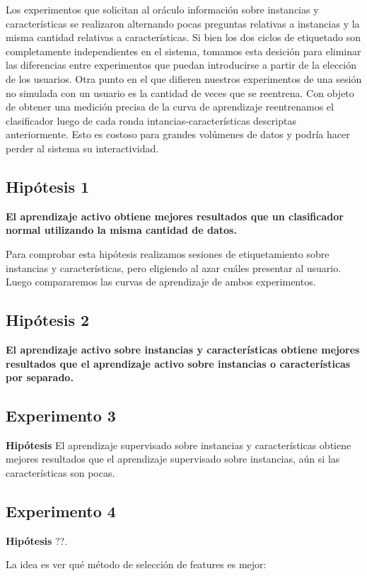 Los experimentos que solicitan al oráculo información sobre instancias y características se realizaron alternando pocas preguntas relativas a instancias y la misma cantidad relativas a características. Si bien los dos ciclos de etiquetado son completamente independientes en el sistema, tomamos esta desición para eliminar las diferencias entre experimentos que puedan introducirse a partir de la elección de los usuarios. Otra punto en el que difieren nuestros experimentos de una sesión no simulada con un usuario es la cantidad de veces que se reentrena. Con objeto de obtener una medición precisa de la curva de aprendizaje reentrenamos el clasificador luego de cada ronda intancias-características descriptas anteriormente. Esto es
costoso para grandes volúmenes de datos y podría hacer perder al sistema su interactividad.

\subsection{Hipótesis 1}
\textbf{El aprendizaje activo obtiene mejores resultados que un clasificador normal utilizando la misma cantidad de datos.}

Para comprobar esta hipótesis realizamos sesiones de etiquetamiento sobre instancias y características, pero eligiendo al azar cuáles presentar al usuario. Luego compararemos las curvas de aprendizaje de ambos experimentos.

\subsection{Hipótesis 2}
\textbf{El aprendizaje activo sobre instancias y características obtiene mejores resultados que el aprendizaje activo sobre instancias o características por separado.}



\subsection{Experimento 3}
\textbf{Hipótesis} El aprendizaje supervisado sobre instancias y características obtiene mejores resultados que el aprendizaje supervisado sobre instancias, aún si las características son pocas.


\subsection{Experimento 4}
\textbf{Hipótesis} ??.

La idea es ver qué método de selección de features es mejor:\\

